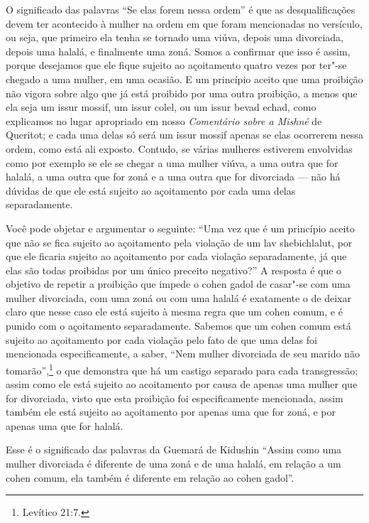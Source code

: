\begin{multicols}{2}
O significado das palavras ``Se elas forem nessa ordem'' é que as
desqualificações devem ter acontecido à mulher na ordem em que foram
mencionadas no versículo, ou seja, que primeiro ela tenha se tornado uma
viúva, depois uma divorciada, depois uma halalá\starr, e finalmente uma
zoná\starr. Somos a confirmar que isso é assim, porque desejamos que ele
fique sujeito ao açoitamento quatro vezes por ter"-se chegado a uma
mulher, em uma ocasião. E um princípio aceito que uma proibição não
vigora sobre algo que já está proibido por uma outra proibição, a menos
que ela seja um issur mossif\starr, um issur
colel\starr, ou um issur bevad
echad\starr, como explicamos no lugar apropriado em
nosso \emph{Comentário sobre a Mishné} de Queritot\starr; e cada uma delas só
será um issur mossif\starr{} apenas se elas ocorrerem nessa ordem, como está
ali exposto. Contudo, se várias mulheres estiverem envolvidas como por
exemplo se ele se chegar a uma mulher viúva, a uma outra que for
halalá\starr, a uma outra que for zoná\starr{} e a uma outra que for
divorciada --- não há dúvidas de que ele está sujeito ao açoitamento por
cada uma delas separadamente.

Você pode objetar e argumentar o seguinte: ``Uma vez que é um princípio
aceito que não se fica sujeito ao açoitamento pela violação de um lav shebichlalut\starr, por que ele ficaria sujeito ao
açoitamento por cada violação separadamente, já que elas são todas
proibidas por um único preceito negativo?'' A resposta é que o objetivo
de repetir a proibição que impede o cohen gadol\starr{} de casar"-se com uma
mulher divorciada, com uma zoná\starr{} ou com uma halalá\starr{} é exatamente o
de deixar claro que nesse caso ele está sujeito à mesma regra que um
cohen\starr{} comum, e é punido com o açoitamento separadamente. Sabemos
que um cohen\starr{} comum está sujeito ao açoitamento por cada violação
pelo fato de que uma delas foi mencionada especificamente, a saber,
``Nem mulher divorciada de seu marido não tomarão'',\footnote{Levítico 21:7.} o
que demonstra que há um castigo separado para cada transgressão; assim
como ele está sujeito ao acoitamento por causa de apenas uma mulher que
for divorciada, visto que esta proibição foi especificamente mencionada,
assim também ele está sujeito ao açoitamento por apenas uma que for
zoná\starr, e por apenas uma que for halalá\starr.


Esse é o significado das palavras da Guemará\starr{} de Kidushin\starr{} ``Assim como
uma mulher divorciada é diferente de uma zoná\starr{} e de uma halalá\starr, em
relação a um cohen\starr{} comum, ela também é diferente em relação ao cohen gadol\starr''.


\end{multicols}
